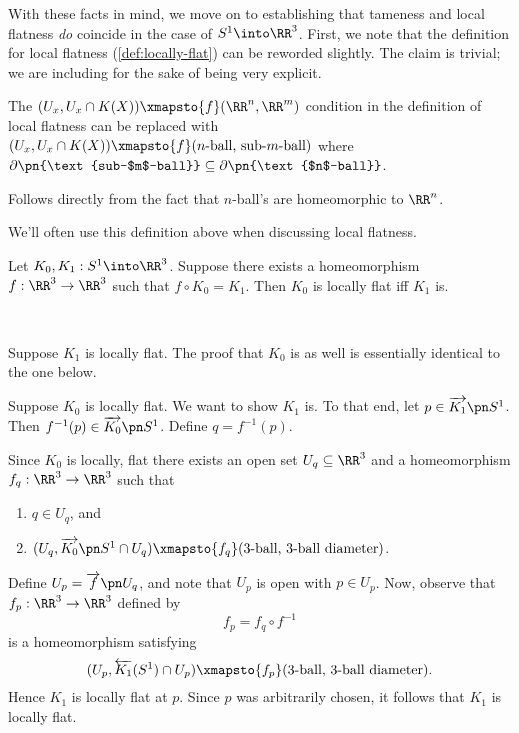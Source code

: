 With these facts in mind, we move on to establishing that tameness and
local flatness \emph{do} coincide in the case of $S^1 \into \RR^3$.
First, we note that the definition for local flatness
(\cref{def:locally-flat}) can be reworded slightly. The claim is
trivial; we are including for the sake of being very explicit.
\begin{lemma}\label{lem:equivalent-locally-flat-def}
  The $(U_x, U_x \cap K(X)) \xmapsto{f} (\RR^n, \RR^m)$ condition in
  the definition of local flatness can be replaced with $(U_x, U_x
  \cap K(X)) \xmapsto{f} (\text{$n$-ball, sub-$m$-ball})$ where
  $\partial \pn{\text{sub-$m$-ball}} \subseteq \partial
  \pn{\text{$n$-ball}}$.
\end{lemma}
\begin{sproof}
  Follows directly from the fact that $n$-ball's are homeomorphic to
  $\RR^n$.
\end{sproof}
We'll often use this definition above when discussing local flatness.
\begin{lemma}\label{lem:local-flatness-homeomorphism}
  Let $K_0, K_1 : S^1\into \RR^3$. Suppose there exists a
  homeomorphism $f : \RR^3 \to \RR^3$ such that $f \circ K_0 = K_1$.
  Then $K_0$ is locally flat iff $K_1$ is.
\end{lemma}
\begin{sproof}~
  \begin{iffproof}
  \item Suppose $K_1$ is locally flat. The proof that $K_0$ is as well
    is essentially identical to the one below.
  \item Suppose $K_0$ is locally flat. We want to show $K_1$ is. To
    that end, let $p \in \fim{K_1}{S^1}$. Then $f^{-1}(p) \in
    \fim{K_0}{S^1}$. Define $q = f^{-1}(p)$.

    Since $K_0$ is locally, flat there exists an open set $U_{q}
    \subseteq \RR^3$ and a homeomorphism $f_q : \RR^3 \to \RR^3$ such
    that
    \begin{enumerate}
      \item $q \in U_q$, and
      \item $(U_q, \fim{K_0}{S^1} \cap U_q) \xmapsto{f_q}
        (\text{3-ball, 3-ball diameter})$.
    \end{enumerate}
    Define $U_p = \fim{f}{U_q}$, and note that $U_p$ is open with $p
    \in U_p$. Now, observe that $f_p : \RR^3 \to \RR^3$ defined by
    \[
      f_p = f_q \circ f^{-1}
    \]
    is a homeomorphism satisfying
    \[
      (U_p, \overleftarrow{K_1}(S^1) \cap U_p) \xmapsto{f_p}
      (\text{3-ball, 3-ball diameter}).
    \]
    Hence $K_1$ is locally flat at $p$. Since $p$ was arbitrarily
    chosen, it follows that $K_1$ is locally flat. \qedhere
  \end{iffproof}
\end{sproof}
